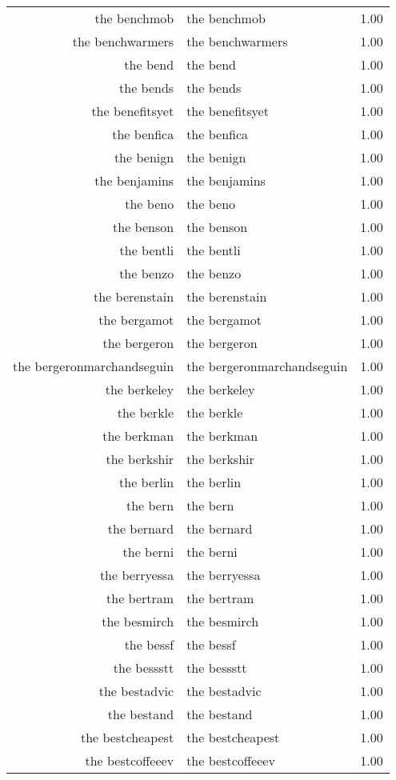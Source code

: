 \begin{table}[ht]
\begin{tabular}{rlr}
  the benchmob & the benchmob & 1.00 \\ 
  the benchwarmers & the benchwarmers & 1.00 \\ 
  the bend & the bend & 1.00 \\ 
  the bends & the bends & 1.00 \\ 
  the benefitsyet & the benefitsyet & 1.00 \\ 
  the benfica & the benfica & 1.00 \\ 
  the benign & the benign & 1.00 \\ 
  the benjamins & the benjamins & 1.00 \\ 
  the beno & the beno & 1.00 \\ 
  the benson & the benson & 1.00 \\ 
  the bentli & the bentli & 1.00 \\ 
  the benzo & the benzo & 1.00 \\ 
  the berenstain & the berenstain & 1.00 \\ 
  the bergamot & the bergamot & 1.00 \\ 
  the bergeron & the bergeron & 1.00 \\ 
  the bergeronmarchandseguin & the bergeronmarchandseguin & 1.00 \\ 
  the berkeley & the berkeley & 1.00 \\ 
  the berkle & the berkle & 1.00 \\ 
  the berkman & the berkman & 1.00 \\ 
  the berkshir & the berkshir & 1.00 \\ 
  the berlin & the berlin & 1.00 \\ 
  the bern & the bern & 1.00 \\ 
  the bernard & the bernard & 1.00 \\ 
  the berni & the berni & 1.00 \\ 
  the berryessa & the berryessa & 1.00 \\ 
  the bertram & the bertram & 1.00 \\ 
  the besmirch & the besmirch & 1.00 \\ 
  the bessf & the bessf & 1.00 \\ 
  the bessstt & the bessstt & 1.00 \\ 
  the bestadvic & the bestadvic & 1.00 \\ 
  the bestand & the bestand & 1.00 \\ 
  the bestcheapest & the bestcheapest & 1.00 \\ 
  the bestcoffeeev & the bestcoffeeev & 1.00 \\ 

\end{tabular}
\end{table}
